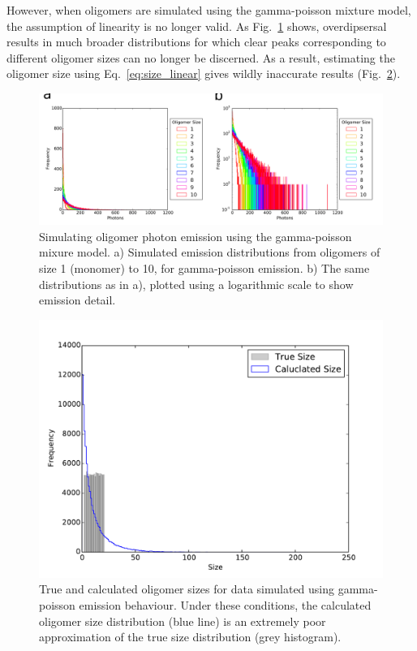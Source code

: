 However, when oligomers are simulated using the gamma-poisson mixture model, the assumption of linearity is no longer valid. As Fig.~\ref{fig:gamma_poisson_size_photons} shows, overdipsersal results in much broader distributions for which clear peaks corresponding to different oligomer sizes can no longer be discerned. As a result, estimating the oligomer size using Eq.~\ref{eq:size_linear} gives wildly inaccurate results (Fig.~\ref{fig:gamma_poisson_size_photons_uniform}).

\begin{figure}
   \begin{center}
      \includegraphics*[clip=true, width=6in]{sizing/gamma_poisson_size_photons.pdf}
      \caption{Simulating oligomer photon emission using the gamma-poisson mixure model. a) Simulated emission distributions from oligomers of size 1 (monomer) to 10, for gamma-poisson emission. b) The same distributions as in a), plotted using a logarithmic scale to show emission detail.}
      \label{fig:gamma_poisson_size_photons}
   \end{center}
\end{figure}

\begin{figure}
   \begin{center}
      \includegraphics*[clip=true, width=6in]{sizing/True_vs_Measured_oligomer_events_uniform_100000_hist.pdf}
      \caption{True and calculated oligomer sizes for data simulated using gamma-poisson emission behaviour. Under these conditions, the calculated oligomer size distribution (blue line) is an extremely poor approximation of the true size distribution (grey histogram).}
      \label{fig:gamma_poisson_size_photons_uniform}
   \end{center}
\end{figure}

